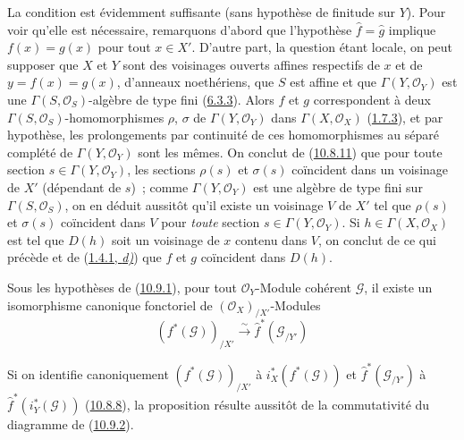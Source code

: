 La condition est évidemment suffisante (sans hypothèse de finitude sur
$Y$). Pour voir qu'elle est nécessaire, remarquons d'abord que l'hypothèse
$\widehat f=\widehat g$ implique $f(x)=g(x)$ pour tout $x\in X'$. D'autre
part, la question étant locale, on peut supposer que $X$ et $Y$ sont des
voisinages ouverts affines respectifs de $x$ et de $y=f(x)=g(x)$,
d'anneaux noethériens, que $S$ est affine et que
$\Gamma(Y,\mathscr{O}_Y)$ est une $\Gamma(S,\mathscr{O}_S)$-algèbre de
type fini (\hyperref[I.6.3.3-fr]{6.3.3}). Alors $f$ et $g$ correspondent à
deux $\Gamma(S,\mathscr{O}_S)$-homomorphismes $\rho$, $\sigma$ de
$\Gamma(Y,\mathscr{O}_Y)$ dans $\Gamma(X,\mathscr{O}_X)$
(\hyperref[I.1.7.3-fr]{1.7.3}), et par hypothèse, les prolongements par
continuité de ces homomorphismes au séparé complété de
$\Gamma(Y,\mathscr{O}_Y)$ sont les mêmes. On conclut de
(\hyperref[I.10.8.11-fr]{10.8.11}) que pour toute section
$s\in\Gamma(Y,\mathscr{O}_Y)$, les sections $\rho(s)$ et $\sigma(s)$
coïncident dans un voisinage de $X'$ (dépendant de $s$)~; comme
$\Gamma(Y,\mathscr{O}_Y)$ est une algèbre de type fini sur
$\Gamma(S,\mathscr{O}_S)$, on en déduit aussitôt qu'il existe un
voisinage $V$ de $X'$ tel que $\rho(s)$ et $\sigma(s)$ coïncident dans
$V$ pour \emph{toute} section $s\in\Gamma(Y,\mathscr{O}_Y)$. Si
$h\in\Gamma(X,\mathscr{O}_X)$ est tel que $D(h)$ soit un voisinage de $x$
contenu dans $V$, on conclut de ce qui précède et de
(\hyperref[I.1.4.1-fr]{1.4.1, \emph{d)}}) que $f$ et $g$ coïncident dans $D(h)$.

\begin{proposition}[10.9.5]
\label{I.10.9.5-fr}
Sous les hypothèses de \textup{(\hyperref[I.10.9.1-fr]{10.9.1})}, pour tout
$\mathscr{O}_Y$-Module cohérent $\mathscr{G}$, il existe un isomorphisme
canonique fonctoriel de $(\mathscr{O}_X)_{/X'}$-Modules
\[
  (f^*(\mathscr{G}))_{/X'}\xrightarrow{\sim}
  \widehat f^*(\mathscr{G}_{/Y'})
\]
\end{proposition}

Si on identifie canoniquement $(f^*(\mathscr{G}))_{/X'}$ à
$i_X^*(f^*(\mathscr{G}))$ et $\widehat f^*(\mathscr{G}_{/Y'})$ à
$\widehat f^*(i_Y^*(\mathscr{G}))$
(\hyperref[I.10.8.8-fr]{10.8.8}), la proposition résulte aussitôt de la
commutativité du diagramme de
(\hyperref[I.10.9.2-fr]{10.9.2}).

